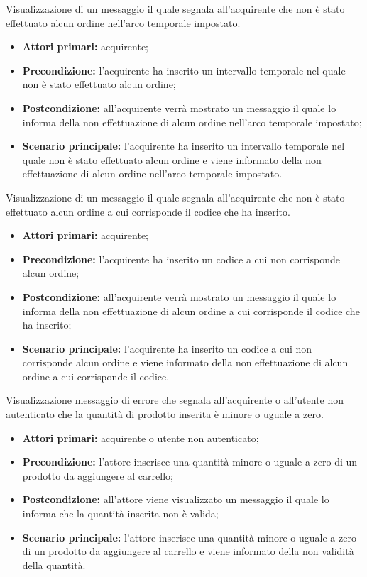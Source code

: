 Visualizzazione di un messaggio il quale segnala all'acquirente che non è stato effettuato alcun ordine nell'arco temporale impostato.
\begin{itemize}
    \item \textbf{Attori primari:} acquirente;
    \item \textbf{Precondizione:} l'acquirente ha inserito un intervallo temporale nel quale non è stato effettuato alcun ordine;
    \item \textbf{Postcondizione:} all'acquirente verrà mostrato un messaggio il quale lo informa della non effettuazione di alcun ordine nell'arco temporale impostato;
    \item \textbf{Scenario principale:} l'acquirente ha inserito un intervallo temporale nel quale non è stato effettuato alcun ordine e viene informato della non effettuazione di alcun ordine nell'arco temporale impostato.
\end{itemize}

Visualizzazione di un messaggio il quale segnala all'acquirente che non è stato effettuato alcun ordine a cui corrisponde il codice che ha inserito.
\begin{itemize}
    \item \textbf{Attori primari:} acquirente;
    \item \textbf{Precondizione:} l'acquirente ha inserito un codice a cui non corrisponde alcun ordine;
    \item \textbf{Postcondizione:} all'acquirente verrà mostrato un messaggio il quale lo informa della non effettuazione di alcun ordine a cui corrisponde il codice che ha inserito;
    \item \textbf{Scenario principale:} l'acquirente ha inserito un codice a cui non corrisponde alcun ordine e viene informato della non effettuazione di alcun ordine a cui corrisponde il codice.
\end{itemize}

Visualizzazione messaggio di errore che segnala all'acquirente o all'utente non autenticato che la quantità di prodotto inserita è minore o uguale a zero.
\begin{itemize}
    \item \textbf{Attori primari:} acquirente o utente non autenticato;
    \item \textbf{Precondizione:} l'attore inserisce una quantità minore o uguale a zero di un prodotto da aggiungere al carrello;
    \item \textbf{Postcondizione:} all'attore viene visualizzato un messaggio il quale lo informa che la quantità inserita non è valida;
    \item \textbf{Scenario principale:} l'attore inserisce una quantità minore o uguale a zero di un prodotto da aggiungere al carrello e viene informato della non validità della quantità.
\end{itemize}

